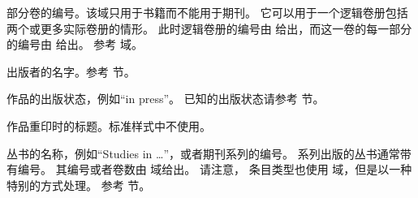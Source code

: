 \begin{fieldlist}

部分卷的编号。该域只用于书籍而不能用于期刊。
它可以用于一个逻辑卷册包括两个或更多实际卷册的情形。
此时逻辑卷册的编号由  给出，而这一卷的每一部分的编号由  给出。
参考  域。




出版者的名字。参考  节。




作品的出版状态，例如“in press”。
已知的出版状态请参考   节。




作品重印时的标题。标准样式中不使用。




丛书的名称，例如“Studies in \dots”，或者期刊系列的编号。
系列出版的丛书通常带有编号。
其编号或者卷数由  域给出。
请注意， 条目类型也使用  域，但是以一种特别的方式处理。
参考  节。




\end{fieldlist}
